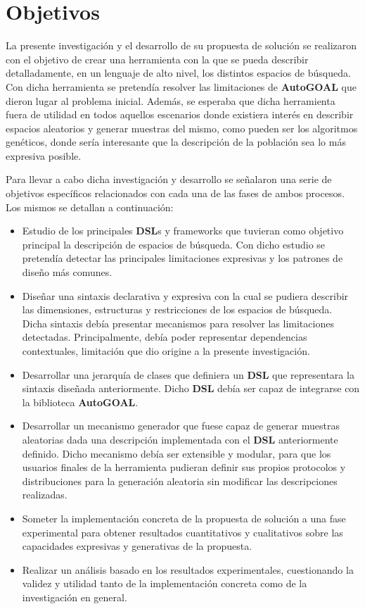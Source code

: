 \section*{Objetivos}

La presente investigación y el desarrollo de su propuesta de solución se realizaron con el objetivo de crear una 
herramienta con la que se pueda describir detalladamente, en un lenguaje de 
alto nivel, los distintos espacios de búsqueda. Con dicha herramienta se 
pretendía resolver las limitaciones de {\bf AutoGOAL} que dieron lugar al problema 
inicial. Además, se esperaba que dicha herramienta fuera de utilidad en todos 
aquellos escenarios donde existiera interés en describir espacios aleatorios 
y generar muestras del mismo, como pueden ser los algoritmos genéticos, donde 
sería interesante que la descripción de la población sea lo más expresiva 
posible.

Para llevar a cabo dicha investigación y desarrollo se señalaron una serie 
de objetivos específicos relacionados con cada una de las fases de ambos 
procesos. Los mismos se detallan a continuación:
\begin{itemize}
    \item Estudio de los principales {\bf DSL}s y frameworks que tuvieran como objetivo 
    principal la descripción de espacios de búsqueda. Con dicho estudio se 
    pretendía detectar las principales limitaciones expresivas y los patrones 
    de diseño más comunes.
    \item Diseñar una sintaxis declarativa y expresiva con la cual se pudiera describir 
    las dimensiones, estructuras y restricciones de los espacios de búsqueda. 
    Dicha sintaxis debía presentar mecanismos para resolver las limitaciones 
    detectadas. Principalmente, debía poder representar dependencias contextuales, 
    limitación que dio origine a la presente investigación.
    \item Desarrollar una jerarquía de clases que definiera un {\bf DSL} que representara la 
    sintaxis diseñada anteriormente. Dicho {\bf DSL} debía ser capaz de integrarse con la 
    biblioteca {\bf AutoGOAL}.\
    \item Desarrollar un mecanismo generador que fuese capaz de generar muestras 
    aleatorias dada una descripción implementada con el {\bf DSL} anteriormente 
    definido. Dicho mecanismo debía ser extensible y modular, para que los 
    usuarios finales de la herramienta pudieran definir sus propios protocolos 
    y distribuciones para la generación aleatoria sin modificar las descripciones 
    realizadas.
    \item Someter la implementación concreta de la propuesta de solución a una fase 
    experimental para obtener resultados cuantitativos y cualitativos sobre las 
    capacidades expresivas y generativas de la propuesta.
    \item Realizar un análisis basado en los resultados experimentales, 
    cuestionando la validez y utilidad tanto de la implementación 
    concreta como de la investigación en general. 
\end{itemize}



